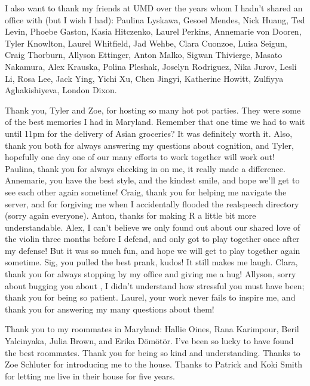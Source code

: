 I also want to thank my friends at UMD over the years whom I hadn’t shared an office with (but I wish I had): Paulina Lyskawa, Gesoel Mendes, Nick Huang, Ted Levin, Phoebe Gaston, Kasia Hitczenko, Laurel Perkins, Annemarie von Dooren, Tyler Knowlton, Laurel Whitfield, Jad Wehbe, Clara Cuonzoe, Luisa Seigun, Craig Thorburn, Allyson Ettinger, Anton Malko, Sigwan Thivierge, Masato Nakamura, Alex Krauska, Polina Pleshak, Joselyn Rodriguez, Nika Jurov, Lesli Li, Rosa Lee, Jack Ying, Yichi Xu, Chen Jingyi, Katherine Howitt, Zulfiyya Aghakishiyeva, London Dixon.
 
Thank you, Tyler and Zoe, for hosting so many hot pot parties. They were some of the best memories I had in Maryland. Remember that one time we had to wait until 11pm for the delivery of Asian groceries? It was definitely worth it. Also, thank you both for always answering my questions about cognition, and Tyler, hopefully one day one of our many efforts to work together will work out! Paulina, thank you for always checking in on me, it really made a difference. Annemarie, you have the best style, and the kindest smile, and hope we’ll get to see each other again sometime! Craig, thank you for helping me navigate the server, and for forgiving me when I accidentally flooded the \textsf{realspeech} directory (sorry again everyone). Anton, thanks for making R a little bit more understandable. Alex, I can’t believe we only found out about our shared love of the violin three months before I defend, and only got to play together once after my defense! But it was so much fun, and hope we will get to play together again sometime. Sig, you pulled the best prank, kudos! It still makes me laugh. Clara, thank you for always stopping by my office and giving me a hug! Allyson, sorry about bugging you about , I didn’t understand how stressful you must have been; thank you for being so patient. Laurel, your work never fails to inspire me, and thank you for answering my many questions about them!
 
Thank you to my roommates in Maryland: Hallie Oines, Rana Karimpour, Beril Yalcinyaka, Julia Brown, and Erika Dömötör. I’ve been so lucky to have found the best roommates. Thank you for being so kind and understanding. Thanks to Zoe Schluter for introducing me to the house. Thanks to Patrick and Koki Smith for letting me live in their house for five years.
 
